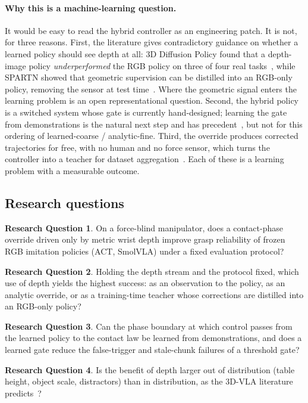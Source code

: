 \documentclass[11pt,a4paper]{article}
\theoremstyle{definition}
\newtheorem{resq}{Research Question}
\begin{document}
\paragraph{Why this is a machine-learning question.}
It would be easy to read the hybrid controller as an engineering patch. It is not, for three reasons. First, the literature gives contradictory guidance on whether a learned policy should see depth at all: 3D Diffusion Policy found that a depth-image policy \emph{underperformed} the RGB policy on three of four real tasks~\citep{ze2024dp3}, while SPARTN showed that geometric supervision can be distilled into an RGB-only policy, removing the sensor at test time~\citep{zhou2023spartn}. Where the geometric signal enters the learning problem is an open representational question. Second, the hybrid policy is a switched system whose gate is currently hand-designed; learning the gate from demonstrations is the natural next step and has precedent~\citep{sundaresan2024sphinx,pan2024switching}, but not for this ordering of learned-coarse / analytic-fine. Third, the override produces corrected trajectories for free, with no human and no force sensor, which turns the controller into a teacher for dataset aggregation~\citep{ross2011dagger}. Each of these is a learning problem with a measurable outcome.

\subsection{Research questions}

\begin{resq}\label{rq:proxy}
On a force-blind manipulator, does a contact-phase override driven only by metric wrist depth improve grasp reliability of frozen RGB imitation policies (ACT, SmolVLA) under a fixed evaluation protocol?
\end{resq}
\begin{resq}\label{rq:where}
Holding the depth stream and the protocol fixed, which use of depth yields the highest success: as an observation to the policy, as an analytic override, or as a training-time teacher whose corrections are distilled into an RGB-only policy?
\end{resq}
\begin{resq}\label{rq:gate}
Can the phase boundary at which control passes from the learned policy to the contact law be learned from demonstrations, and does a learned gate reduce the false-trigger and stale-chunk failures of a threshold gate?
\end{resq}
\begin{resq}\label{rq:ood}
Is the benefit of depth larger out of distribution (table height, object scale, distractors) than in distribution, as the 3D-VLA literature predicts~\citep{li2025pointvla}?
\end{resq}
\end{document}
